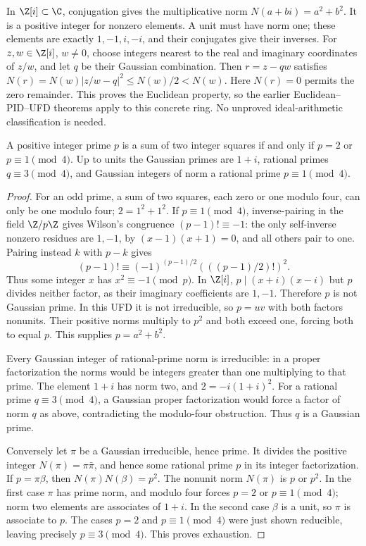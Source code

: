 In $\Z[i]\subset\C$, conjugation gives the multiplicative norm
$N(a+bi)=a^2+b^2$. It is a positive integer for nonzero elements.
A unit must have norm one; these elements are exactly
$1,-1,i,-i$, and their conjugates give their inverses.
For $z,w\in\Z[i]$, $w\ne0$, choose integers nearest to the real
and imaginary coordinates of $z/w$, and let $q$ be their
Gaussian combination. Then $r=z-qw$ satisfies
$N(r)=N(w)|z/w-q|^2\le N(w)/2<N(w)$.
Here $N(r)=0$ permits the zero remainder. This proves the
Euclidean property, so the earlier Euclidean--PID--UFD theorems
apply to this concrete ring. No unproved ideal-arithmetic
classification is needed.

\begin{theorem}\label{thm:prime-two-squares}
A positive integer prime $p$ is a sum of two integer squares
if and only if $p=2$ or $p\equiv1\pmod4$.
Up to units the Gaussian primes are $1+i$, rational primes
$q\equiv3\pmod4$, and Gaussian integers of norm a rational
prime $p\equiv1\pmod4$.
\end{theorem}
\begin{proof}
For an odd prime, a sum of two squares, each zero or one modulo
four, can only be one modulo four; $2=1^2+1^2$.
If $p\equiv1\pmod4$, inverse-pairing in the field $\Z/p\Z$
gives Wilson's congruence $(p-1)!\equiv-1$: the only
self-inverse nonzero residues are $1,-1$, by
$(x-1)(x+1)=0$, and all others pair to one.
Pairing instead $k$ with $p-k$ gives
\[
 (p-1)!\equiv(-1)^{(p-1)/2}
 \left(((p-1)/2)!\right)^2.
\]
Thus some integer $x$ has $x^2\equiv-1\pmod p$.
In $\Z[i]$, $p\mid(x+i)(x-i)$ but $p$ divides neither factor,
as their imaginary coefficients are $1,-1$. Therefore $p$
is not Gaussian prime. In this UFD it is not irreducible,
so $p=uv$ with both factors nonunits. Their positive norms
multiply to $p^2$ and both exceed one, forcing both to equal
$p$. This supplies $p=a^2+b^2$.

Every Gaussian integer of rational-prime norm is irreducible:
in a proper factorization the norms would be integers greater
than one multiplying to that prime. The element $1+i$ has
norm two, and $2=-i(1+i)^2$.
For a rational prime $q\equiv3\pmod4$, a Gaussian proper
factorization would force a factor of norm $q$ as above,
contradicting the modulo-four obstruction. Thus $q$ is a
Gaussian prime.

Conversely let $\pi$ be a Gaussian irreducible, hence prime.
It divides the positive integer $N(\pi)=\pi\bar\pi$, and hence
some rational prime $p$ in its integer factorization.
If $p=\pi\beta$, then $N(\pi)N(\beta)=p^2$.
The nonunit norm $N(\pi)$ is $p$ or $p^2$.
In the first case $\pi$ has prime norm, and modulo four
forces $p=2$ or $p\equiv1\pmod4$; norm two elements are
associates of $1+i$. In the second case $\beta$ is a unit,
so $\pi$ is associate to $p$. The cases $p=2$ and
$p\equiv1\pmod4$ were just shown reducible, leaving precisely
$p\equiv3\pmod4$. This proves exhaustion.
\end{proof}

